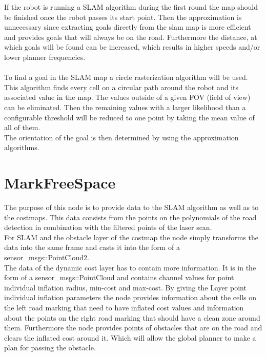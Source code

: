 If the robot is running a SLAM algorithm during the first round the map should be finished once the robot passes its start point. Then the approximation is unnecessary since extracting goals directly from the slam map is more efficient and provides goals that will  always be on the road. Furthermore the distance, at which goals will be found can be increased, which results in higher speeds and/or lower planner frequencies.\\\\

To find a goal in the SLAM map a circle rasterization algorithm will be used.\\

This algorithm finds every cell on a circular path around the robot and its associated value in the map. The values outside of a given FOV (field of view) can be eliminated. Then the remaining values with a larger likelihood than a configurable threshold will be reduced to one point by taking the mean value of all of them.\\

The orientation of the goal is then determined by using the approximation algorithms.


\section{MarkFreeSpace}

The purpose of this node is to provide data to the SLAM algorithm as well as to the costmaps. This data consists from the points on the polynomials of the road detection in combination with the filtered points of the laser scan.\\

For SLAM and the obstacle layer of the costmap the node simply transforms the data into the same frame and casts it into the form of a sensor\_msgs::PointCloud2.\\

The data of the dynamic cost layer has to contain more information. It is in the form of a sensor\_msgs::PointCloud and contains channel values for point individual inflation radius, min-cost and max-cost. By giving the Layer point individual inflation parameters the node provides information about the cells on the left road marking that need to have inflated cost values and information about the points on the right road marking that should have a clean zone around them. Furthermore the node provides points of obstacles that are on the road and clears the inflated cost around it. Which will allow the global planner to make a plan for passing the obstacle.







